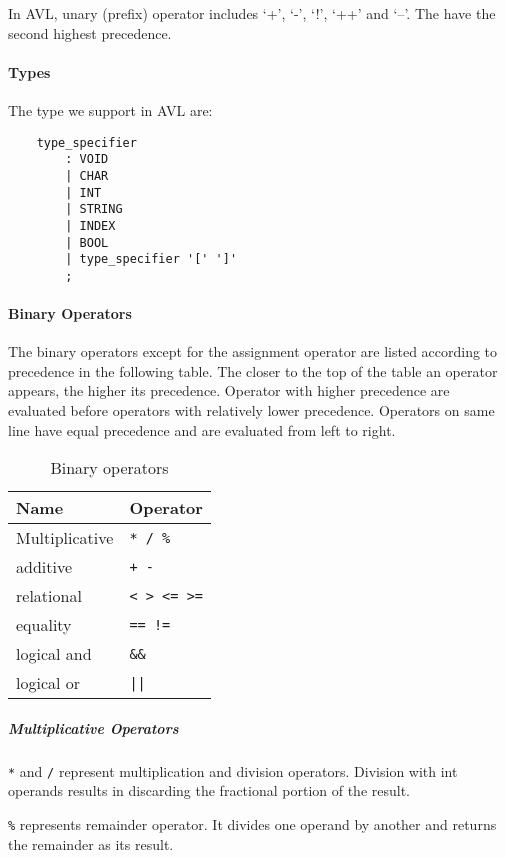 In AVL, unary (prefix) operator includes ‘+’, ‘-’, ‘!’, ‘++’ and ‘--’. The have the second highest
precedence.

\paragraph{Types}
The type we support in AVL are:

\begin{verbatim}
    type_specifier
        : VOID
        | CHAR
        | INT
        | STRING
        | INDEX
        | BOOL
        | type_specifier '[' ']'
        ;
\end{verbatim}

\paragraph{Binary Operators}
The binary operators except for the assignment operator are listed according to precedence in the
following table. The closer to the top of the table an operator appears, the higher its precedence.
Operator with higher precedence are evaluated before operators with relatively lower precedence.
Operators on same line have equal precedence and are evaluated from left to right.

\begin{table}[htp]
  \centering
  \begin{tabular}{l|l}
    \hline
    Name & Operator \\
    \hline
    Multiplicative \hspace{2cm} & \verb"* / %" \\
    additive & \verb"+ -" \\
    relational & \verb"< > <= >=" \\
    equality & \verb"== !=" \\
    logical and & \verb"&&" \\
    logical or & \verb"||" \\
    \hline
  \end{tabular}
  \caption{Binary operators}
  \label{tab:bin_op}
\end{table}

\subparagraph{Multiplicative Operators}
\verb"*" and \verb"/" represent multiplication and division operators. Division with int operands
results in discarding the fractional portion of the result.

\verb"%" represents remainder operator. It divides one operand by another and returns the remainder
as its result.


